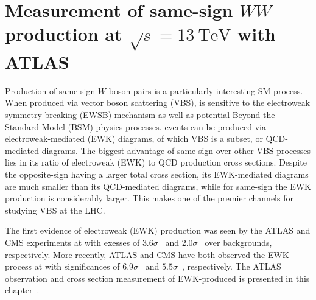 \chapter[Measurement of same-sign $WW$ production at $\sqrt{s} = 13~\mathrm{TeV}$ with ATLAS][Measurement of same-sign $WW$ production at $\sqrt{s} = 13~\mathrm{TeV}$ with ATLAS]{Measurement of same-sign $WW$ production at $\sqrt{s} = 13~\mathrm{TeV}$ with ATLAS}
\label{ch:ssww13tev}
\setcounter{subsection}{0}

Production of same-sign $W$ boson pairs is a particularly interesting SM process.
When produced via vector boson scattering (VBS), \ssww is sensitive to the electroweak symmetry breaking (EWSB) mechanism as well as potential Beyond the Standard Model (BSM) physics processes.
\ssww events can be produced via electroweak-mediated (EWK) diagrams, of which VBS is a subset, or QCD-mediated diagrams. 
The biggest advantage of same-sign \ssww over other VBS processes lies in its ratio of electroweak (EWK) to QCD production cross sections.
Despite the opposite-sign \osww having a larger total cross section, its EWK-mediated diagrams are much smaller than its QCD-mediated diagrams, while for same-sign \sswwnojj the EWK production is considerably larger.
This makes \ssww one of the premier channels for studying VBS at the LHC.

The first evidence of electroweak (EWK) \ssww production was seen by the ATLAS and CMS experiments at  with exesses of $3.6\sigma$~\cite{2014.ssww-8tev-atlas} and $2.0\sigma$~\cite{2015-ssww-8tev-cms} over backgrounds, respectively.
More recently, ATLAS and CMS have both observed the EWK process at  with significances of $6.9\sigma$~\cite{2018.ssww-13tev-atlas-conf} and $5.5\sigma$~\cite{2017.ssww-13tev-cms}, respectively.
The ATLAS  observation and cross section measurement of EWK-produced \ssww is presented in this chapter~\cite{2018.ssww-13tev-atlas-conf, 2018.ssww-13tev-atlas-support}.



